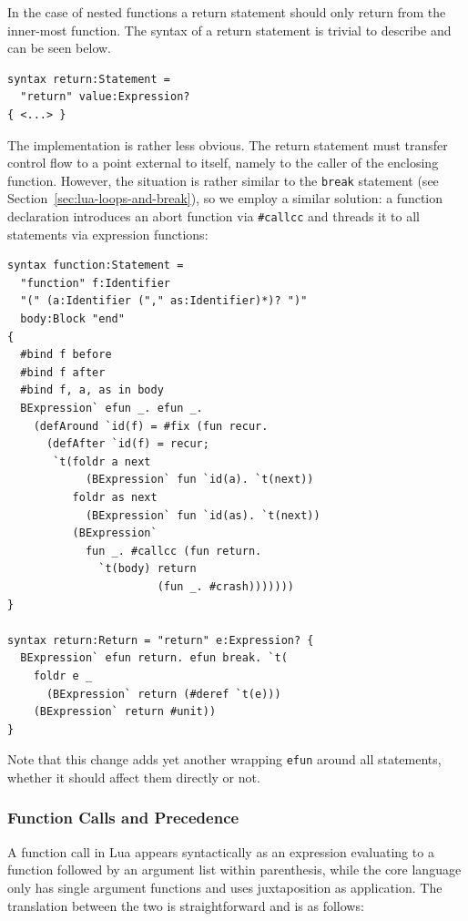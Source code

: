 \documentclass{kththesis}
\begin{document}
In the case of nested functions a return statement should only return from the inner-most function. The syntax of a return statement is trivial to describe and can be seen below.

\begin{verbatim}
syntax return:Statement =
  "return" value:Expression?
{ <...> }
\end{verbatim}

The implementation is rather less obvious. The return statement must transfer control flow to a point external to itself, namely to the caller of the enclosing function. However, the situation is rather similar to the \texttt{break} statement (see Section~\ref{sec:lua-loops-and-break}), so we employ a similar solution: a function declaration introduces an abort function via \texttt{#callcc} and threads it to all statements via expression functions:

\begin{verbatim}
syntax function:Statement =
  "function" f:Identifier
  "(" (a:Identifier ("," as:Identifier)*)? ")"
  body:Block "end"
{
  #bind f before
  #bind f after
  #bind f, a, as in body
  BExpression` efun _. efun _.
    (defAround `id(f) = #fix (fun recur.
      (defAfter `id(f) = recur;
       `t(foldr a next
            (BExpression` fun `id(a). `t(next))
          foldr as next
            (BExpression` fun `id(as). `t(next))
          (BExpression`
            fun _. #callcc (fun return.
              `t(body) return
                       (fun _. #crash)))))))
}

syntax return:Return = "return" e:Expression? {
  BExpression` efun return. efun break. `t(
    foldr e _
      (BExpression` return (#deref `t(e)))
    (BExpression` return #unit))
}
\end{verbatim}

Note that this change adds yet another wrapping \texttt{efun} around all statements, whether it should affect them directly or not.

\subsubsection{Function Calls and Precedence} \label{sec:lua-func-call-precedence}

A function call in Lua appears syntactically as an expression evaluating to a function followed by an argument list within parenthesis, while the core language only has single argument functions and uses juxtaposition as application. The translation between the two is straightforward and is as follows:
\end{document}
